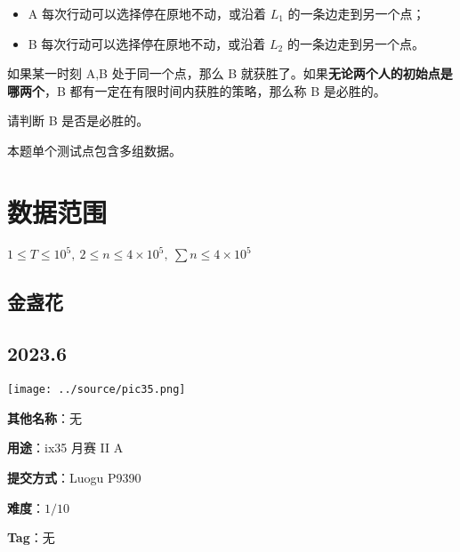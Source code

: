 \documentclass[a4paper,10pt]{article}
\begin{document}
\begin{itemize}
\item A 每次行动可以选择停在原地不动，或沿着 $L_1$ 的一条边走到另一个点；

\item B 每次行动可以选择停在原地不动，或沿着 $L_2$ 的一条边走到另一个点。
\end{itemize}

如果某一时刻 A,B 处于同一个点，那么 B 就获胜了。如果\textbf{无论两个人的初始点是哪两个}，B 都有一定在有限时间内获胜的策略，那么称 B 是必胜的。

请判断 B 是否是必胜的。

本题单个测试点包含多组数据。

\section*{数据范围}

$1\leq T\leq 10^5,\ 2\leq n\leq 4\times 10^5,\ \sum n\leq 4\times 10^5$

\newpage

\vspace*{\fill}
\begin{center}

\section{金盏花}

\subsection*{2023.6}

\vspace{10pt}

\texttt{[image: ../source/pic35.png]}

\vspace{10pt}

\textbf{其他名称}：无

\vspace{10pt}

\textbf{用途}：ix35 月赛 II A

\vspace{10pt}

\textbf{提交方式}：Luogu P9390

\vspace{10pt}

\textbf{难度}：$1/10$

\vspace{10pt}

\textbf{Tag}：无

\end{center}
\vspace*{\fill}
\end{document}
